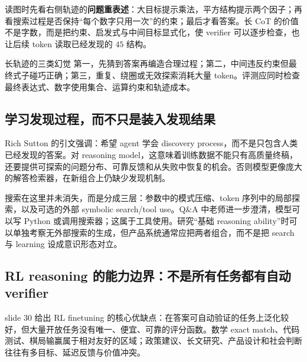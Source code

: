 读图时先看右侧轨迹的\textbf{问题重表述}：大目标提示乘法，平方结构提示两个因子；再看搜索过程是否保持“每个数字只用一次”的约束；最后才看答案。长 CoT 的价值不是字数，而是把约束、启发式与中间目标显式化，使 verifier 可以逐步检查，也让后续 token 读取已经发现的 $45$ 结构。

\begin{warningbox}{长轨迹的三类幻觉}
第一，先猜到答案再编造合理过程；第二，中间违反约束但最终式子碰巧正确；第三，重复、绕圈或无效探索消耗大量 token。评测应同时检查最终表达式、数字使用集合、运算约束和轨迹成本。
\end{warningbox}

\subsection{学习发现过程，而不只是装入发现结果}

Rich Sutton 的引文强调：希望 agent 学会 discovery process，而不是只包含人类已经发现的答案。对 reasoning model，这意味着训练数据不能只有高质量终稿，还要提供可探索的问题分布、可靠反馈和从失败中恢复的机会。否则模型更像庞大的解答检索器，在新组合上仍缺少发现机制。



搜索在这里并未消失，而是分成三层：参数中的模式压缩、token 序列中的局部探索，以及可选的外部 symbolic search/tool use。Q\&A 中老师进一步澄清，模型可以写 Python 或调用搜索器；这属于工具使用。研究“基础 reasoning ability”时可以单独考察无外部搜索的生成，但产品系统通常应把两者组合，而不是把 search 与 learning 设成意识形态对立。

\subsection{RL reasoning 的能力边界：不是所有任务都有自动 verifier}

slide 30 给出 RL finetuning 的核心优缺点：在答案可自动验证的任务上泛化较好，但大量开放任务没有唯一、便宜、可靠的评分函数。数学 exact match、代码测试、棋局输赢属于相对友好的区域；政策建议、长文研究、产品设计和社会判断往往有多目标、延迟反馈与价值冲突。


